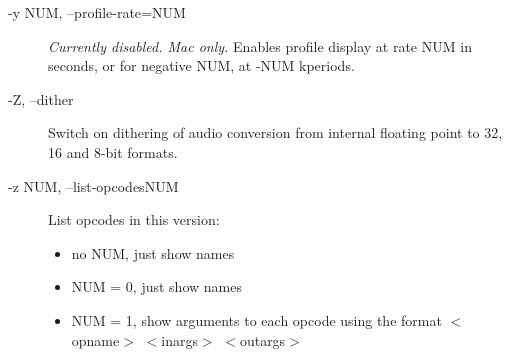 \begin{description}
\item[-y NUM, --profile-rate=NUM]

 \emph{Currently disabled. Mac only.}
 Enables profile display at rate NUM in seconds, or for negative NUM, at -NUM kperiods. 

\item[-Z, --dither]

  Switch on dithering of audio conversion from internal floating point to 32, 16 and 8-bit formats. 

\item[-z NUM, --list-opcodesNUM]

  List opcodes in this version: 


 
\begin{itemize}
\item 

 no NUM, just show names

\item 

 NUM = 0, just show names

\item 

 NUM = 1, show arguments to each opcode using the format $<$opname$>$ $<$inargs$>$ $<$outargs$>$


\end{itemize}


\end{description}


\begin{comment}
\begin{tabular}{lcr}
Previous &Home &Next \\
Description &Up &Unified File Format for Orchestras and Scores

\end{tabular}



\end{comment}
